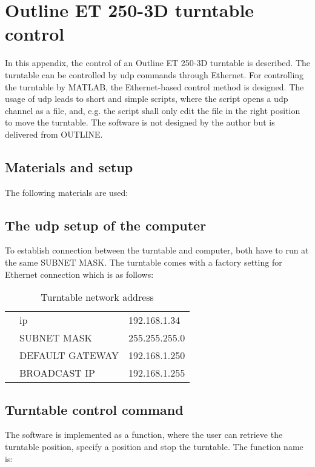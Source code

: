 \chapter{Outline ET 250-3D turntable control}\label{appendix:turntable}
In this appendix, the control of an Outline ET 250-3D turntable is described. The turntable can be controlled by \gls{udp} commands through Ethernet. For controlling the turntable by MATLAB, the Ethernet-based control method is designed. The usage of \gls{udp} leads to short and simple scripts, where the script opens a \gls{udp} channel as a file, and, e.g. the script shall only edit the file in the right position to move the turntable. The \matlab software is not designed by the author but is delivered from OUTLINE. 

\section*{Materials and setup}
The following materials are used:
\startequipment
{}
\stopequipment

\section*{The \gls{udp} setup of the computer}
To establish connection between the turntable and computer, both have to run at the same SUBNET MASK. The turntable comes with a factory setting for Ethernet connection which is as follows:

\begin{table}[H]
\centering
\caption{Turntable network address}
\label{udp_setup_for_computer}
\begin{tabular}{lll}
 & \gls{ip} & 192.168.1.34   \\
 & SUBNET MASK  & 255.255.255.0   \\
 & DEFAULT GATEWAY  & 192.168.1.250  \\
 & BROADCAST IP   &  192.168.1.255   
\end{tabular}
\end{table}



\section*{Turntable control command}
The software is implemented as a function, where the user can retrieve the turntable position, specify a position and stop the turntable. The function name is:

